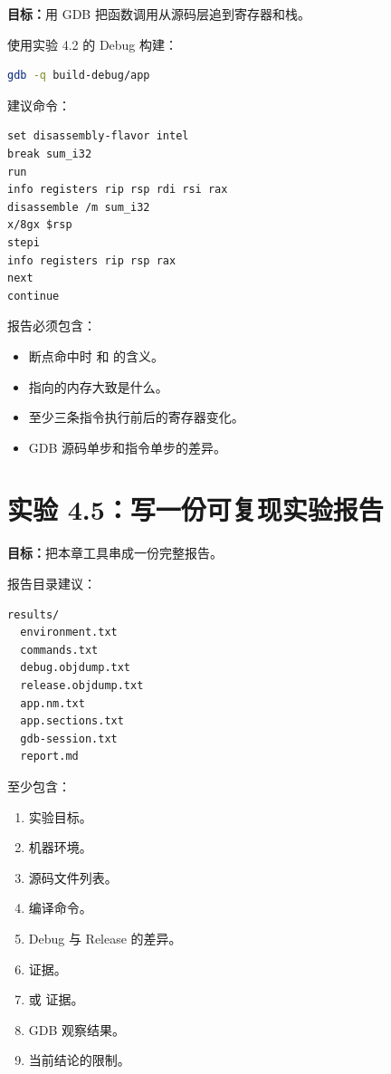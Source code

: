 \begin{labbox}
\textbf{目标：}用 GDB 把函数调用从源码层追到寄存器和栈。

使用实验 4.2 的 Debug 构建：

\begin{lstlisting}[language=bash]
gdb -q build-debug/app
\end{lstlisting}

建议命令：

\begin{lstlisting}
set disassembly-flavor intel
break sum_i32
run
info registers rip rsp rdi rsi rax
disassemble /m sum_i32
x/8gx $rsp
stepi
info registers rip rsp rax
next
continue
\end{lstlisting}

报告必须包含：

\begin{itemize}
  \item 断点命中时  和  的含义。
  \item {} 指向的内存大致是什么。
  \item 至少三条指令执行前后的寄存器变化。
  \item GDB 源码单步和指令单步的差异。
\end{itemize}
\end{labbox}

\section{实验 4.5：写一份可复现实验报告}

\begin{labbox}
\textbf{目标：}把本章工具串成一份完整报告。

报告目录建议：

\begin{lstlisting}
results/
  environment.txt
  commands.txt
  debug.objdump.txt
  release.objdump.txt
  app.nm.txt
  app.sections.txt
  gdb-session.txt
  report.md
\end{lstlisting}

 至少包含：

\begin{enumerate}
  \item 实验目标。
  \item 机器环境。
  \item 源码文件列表。
  \item 编译命令。
  \item Debug 与 Release 的差异。
  \item {} 证据。
  \item {} 或  证据。
  \item GDB 观察结果。
  \item 当前结论的限制。
\end{enumerate}
\end{labbox}

